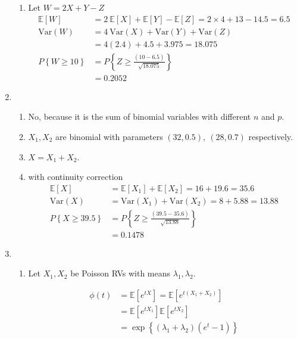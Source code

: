 \begin{enumerate}
\begin{enumerate}
			\item Let $ W = 2X + Y - Z $ \\
			\begin{align}
				\mathbb{E}[W] &= 2\ \mathbb{E}[X] + \mathbb{E}[Y] - \mathbb{E}[Z] = 2 \times 4 + 13 - 14.5 = 6.5 \nonumber \\
				\mathrm{Var}(W) &= 4\ \mathrm{Var}(X) + \mathrm{Var}(Y) + \mathrm{Var}(Z) \nonumber \\ 
				&= 4 (2.4) + 4.5 + 3.975 = 18.075  \nonumber \\
				P \left\{W \geq 10 \right\} &= P \left\{ Z \geq \frac{(10 - 6.5)}{\sqrt{18.075}} \right\} \nonumber \\
				&= 0.2052
			\end{align}
		\end{enumerate}
	
	
	\item
	
		\begin{enumerate}
			\item No, because it is the sum of binomial variables with different $ n $ and $ p $.
			
			\item $ X_1, X_2 $ are binomial with parameters $ (32, 0.5), \ (28, 0.7) $ respectively.
			
			\item $ X = X_1 + X_2 $.
			
			\item with continuity correction\\
			\begin{align}
				\mathbb{E}[X] &= \mathbb{E}[X_1] + \mathbb{E}[X_2] = 16 + 19.6 = 35.6 \nonumber \\
				\mathrm{Var}(X) &= \mathrm{Var}(X_1) + \mathrm{Var}(X_2) = 8 + 5.88 = 13.88 \nonumber \\
				P \left\{X \geq 39.5 \right\} &= P \left\{ Z \geq \frac{(39.5 - 35.6)}{\sqrt{13.88}} \right\} \nonumber \\
				&= 0.1478
			\end{align}
		\end{enumerate}
	
	
	\item
	
		\begin{enumerate}
			\item Let $ X_1, X_2 $ be Poisson RVs with  means $ \lambda_1, \lambda_2 $.
			
			\begin{align}
				\phi (t) &= \mathbb{E}[e^{tX}] = \mathbb{E}[e^{t(X_1 + X_2)}] \nonumber \\[1ex]
				&= \mathbb{E}[e^{tX_1}] \mathbb{E}[e^{tX_2}] \nonumber \\[1ex]
				&= \exp\left\{(\lambda_1 + \lambda_2) (e^t - 1)\right\}
			\end{align}
			

\end{enumerate}
\end{enumerate}
